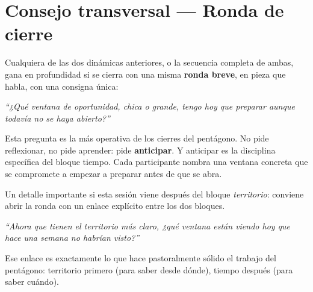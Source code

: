\documentclass[11pt, a4paper]{article}
\begin{document}
\section*{Consejo transversal --- Ronda de cierre}

Cualquiera de las dos dinámicas anteriores, o la secuencia completa de ambas, gana en profundidad si se cierra con una misma \textbf{ronda breve}, en pieza que habla, con una consigna única:

\vspace{0.5em}

\begin{center}
\begin{tcolorbox}[
  enhanced, colback=tiempoAmbar, colframe=tiempoAmbar,
  boxrule=0pt, arc=3pt,
  left=18pt, right=18pt, top=16pt, bottom=16pt,
  width=0.86\linewidth,
  halign=center
]
  {\color{parch}\itshape\large ``¿Qué ventana de oportunidad, chica o grande, tengo hoy que preparar aunque todavía no se haya abierto?''}
\end{tcolorbox}
\end{center}

\vspace{0.5em}

Esta pregunta es la más operativa de los cierres del pentágono. No pide reflexionar, no pide aprender: pide \textbf{anticipar}. Y anticipar es la disciplina específica del bloque tiempo. Cada participante nombra una ventana concreta que se compromete a empezar a preparar antes de que se abra.

Un detalle importante si esta sesión viene después del bloque \emph{territorio}: conviene abrir la ronda con un enlace explícito entre los dos bloques.

\begin{center}
\begin{tcolorbox}[
  enhanced, colback=white, colframe=tiempoAmbar,
  boxrule=0.8pt, arc=2pt,
  left=14pt, right=14pt, top=10pt, bottom=10pt,
  width=0.9\linewidth,
]
  {\color{tinte}\itshape ``Ahora que tienen el territorio más claro, ¿qué ventana están viendo hoy que hace una semana no habrían visto?''}
\end{tcolorbox}
\end{center}

Ese enlace es exactamente lo que hace pastoralmente sólido el trabajo del pentágono: territorio primero (para saber desde dónde), tiempo después (para saber cuándo).
\end{document}
